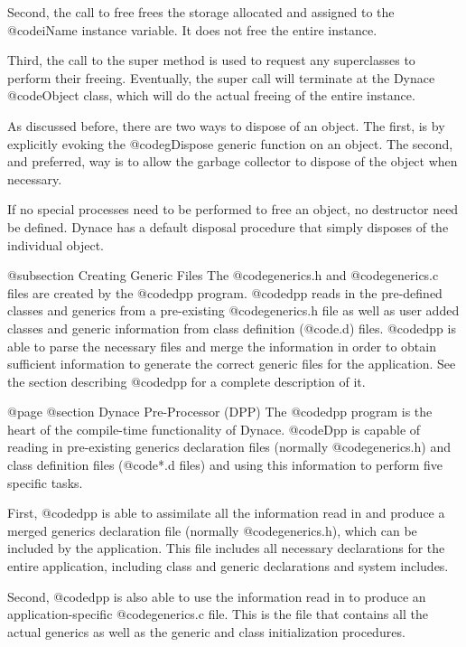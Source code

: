 Second, the call to free frees the storage allocated and assigned to
the @code{iName} instance variable.  It does not free the entire
instance.

Third, the call to the super method is used to request any
superclasses to perform their freeing.  Eventually, the super call will
terminate at the Dynace @code{Object} class, which will do the actual
freeing of the entire instance.

As discussed before, there are two ways to dispose of an object.  The
first, is by explicitly evoking the @code{gDispose} generic function on
an object.  The second, and preferred, way is to allow the garbage
collector to dispose of the object when necessary.

If no special processes need to be performed to free an object, no
destructor need be defined.  Dynace has a default disposal procedure
that simply disposes of the individual object.


@subsection Creating Generic Files
The @code{generics.h} and @code{generics.c} files are created by the
@code{dpp} program.  @code{dpp} reads in the pre-defined classes and
generics from a pre-existing @code{generics.h} file as well as user
added classes and generic information from class definition (@code{.d})
files.  @code{dpp} is able to parse the necessary files and merge
the information in order to obtain sufficient information to generate
the correct generic files for the application.   See the section describing
@code{dpp} for a complete description of it.


@page
@section Dynace Pre-Processor (DPP)
The @code{dpp} program is the heart of the compile-time functionality of
Dynace.  @code{Dpp} is capable of reading in pre-existing generics
declaration files (normally @code{generics.h}) and class
definition files (@code{*.d} files) and using this information to
perform five specific tasks.

First, @code{dpp} is able to assimilate all the information read
in and produce a merged generics declaration file (normally
@code{generics.h}), which can be included by the application.
This file includes all necessary declarations for the entire application,
including class and generic declarations and system includes.

Second, @code{dpp} is also able to use the information read in
to produce an application-specific @code{generics.c} file.
This is the file that contains all the actual generics as well
as the generic and class initialization procedures.

